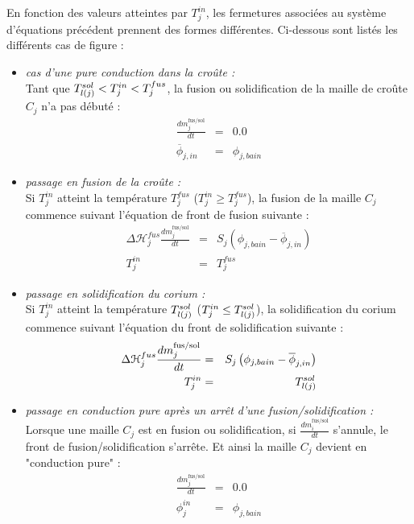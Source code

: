 En fonction des valeurs atteintes par $T_j^{in}$, les fermetures associées au système d'équations précédent prennent des formes différentes. Ci-dessous sont listés les différents cas de figure :\\

\begin{itemize}
\item {\it cas d'une pure conduction dans la croûte :}\\
Tant que $\temperature[sol]{l(j)}<T_j^{in}<T_j^{fus}$, la fusion ou solidification de la maille de croûte $C_j$ n'a pas débuté :
\begin{eqnarray*}
\frac{dm_j^\text{fus/sol}}{dt} &=& 0.0 \\
\overline{\phi}_{j,in} &=& \phi_{j,bain}
\end{eqnarray*}

\item {\it passage en fusion de la croûte :}\\
Si $T_j^{in}$ atteint la température $T_j^{fus}$ ($T_j^{in}\ge T_j^{fus}$), la fusion de la maille $C_j$ commence suivant l'équation de front de fusion suivante :
\begin{eqnarray*}
\Delta \mathcal{H}_j^{fus} \frac{dm_j^\text{fus/sol}}{dt} &=& S_j\left(\phi_{j,bain} - \overline{\phi}_{j,in}\right) \\
T_j^{in} &=& T_j^{fus}
\end{eqnarray*}

\item {\it passage en solidification du corium :}\\
Si $T_j^{in}$ atteint la température $\temperature[sol]{l(j)}$ ($T_j^{in}\le \temperature[sol]{l(j)}$), la solidification du corium commence suivant l'équation du front de solidification suivante :
\begin{eqnarray*}
\Delta \mathcal{H}_j^{fus} \frac{dm_j^\text{fus/sol}}{dt} &=& S_j\left(\phi_{j,bain} - \overline{\phi}_{j,in}\right) \\
T_j^{in} &=& \temperature[sol]{l(j)}
\end{eqnarray*}

\item {\it passage en conduction pure après un arrêt d'une fusion/solidification :}\\
Lorsque une maille $C_j$ est en fusion ou solidification, si $\frac{dm_i^\text{fus/sol}}{dt}$ s'annule, le front de fusion/solidification s'arrête. Et ainsi la maille $C_j$ devient en "conduction pure" :
\begin{eqnarray*}
\frac{dm_j^\text{fus/sol}}{dt} &=& 0.0 \\
\phi_j^{in} &=& \phi_{j,bain}
\end{eqnarray*}
\end{itemize}

